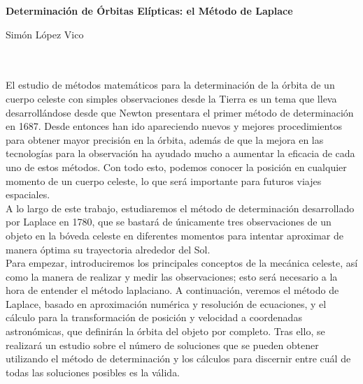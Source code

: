 
\thispagestyle{empty}





\clearpage{\thispagestyle{empty}\cleardoublepage}

\thispagestyle{empty}
\begin{center}
{
	\large\bfseries Determinación de Órbitas Elípticas: el Método de Laplace
}\\
\end{center}

\begin{center}
	Simón López Vico\\
\end{center}

\\

\vspace{0.7cm}
\\

El estudio de métodos matemáticos para la determinación de la órbita de un cuerpo celeste con simples observaciones desde la Tierra es un tema que lleva desarrollándose desde que Newton presentara el primer método de determinación en 1687. Desde entonces han ido apareciendo nuevos y mejores procedimientos para obtener mayor precisión en la órbita, además de que la mejora en las tecnologías para la observación ha ayudado mucho a aumentar la eficacia de cada uno de estos métodos. Con todo esto, podemos conocer la posición en cualquier momento de un cuerpo celeste, lo que será importante para futuros viajes espaciales.\\

A lo largo de este trabajo, estudiaremos el método de determinación desarrollado por Laplace en 1780, que se bastará de únicamente tres observaciones de un objeto en la bóveda celeste en diferentes momentos para intentar aproximar de manera óptima su trayectoria alrededor del Sol.\\

Para empezar, introduciremos los principales conceptos de la mecánica celeste, así como la manera de realizar y medir las observaciones; esto será necesario a la hora de entender el método laplaciano. A continuación, veremos el método de Laplace, basado en aproximación numérica y resolución de ecuaciones, y el cálculo para la transformación de posición y velocidad a coordenadas astronómicas, que definirán la órbita del objeto por completo. Tras ello, se realizará un estudio sobre el número de soluciones que se pueden obtener utilizando el método de determinación y los cálculos para discernir entre cuál de todas las soluciones posibles es la válida.\\

